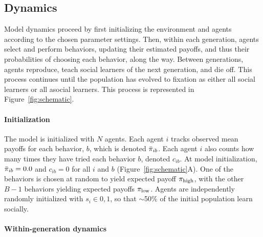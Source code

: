 \documentclass[letterpaper,11.5pt]{scrartcl}
\begin{document}
\subsection{Dynamics}

Model dynamics proceed by first initializing the environment and agents according
to the chosen parameter settings. %
Then, within each generation, agents select and perform behaviors, updating their estimated payoffs, and thus their probabilities of choosing each behavior, along the way.
Between generations, agents reproduce, teach social learners of the next generation, and die off. 
This process continues until the population has evolved to fixation as either all social learners or all asocial learners. This process is represented in
Figure~\ref{fig:schematic}.


\paragraph{Initialization}

The model is initialized with $N$ agents. Each agent $i$ tracks 
observed mean payoffs for each behavior, $b$, which is denoted $\bar\pi_{ib}$. Each
agent $i$ also counts how many times they have tried each behavior $b$, 
denoted $c_{ib}$. At model initialization, $\bar\pi_{ib} = 0.0$ and $c_{ib} = 0$ for
all $i$ and $b$ (Figure~\ref{fig:schematic}A).
One of the behaviors is chosen at random to yield expected payoff $\pi_{\mathrm{high}}$, with the other $B-1$ behaviors yielding
expected payoffs $\pi_{\mathrm{low}}$. Agents are independently randomly initialized with $s_i
\in 0,1$, so that $\sim$50\% of the initial population learn socially.


\paragraph{Within-generation dynamics}
\end{document}

